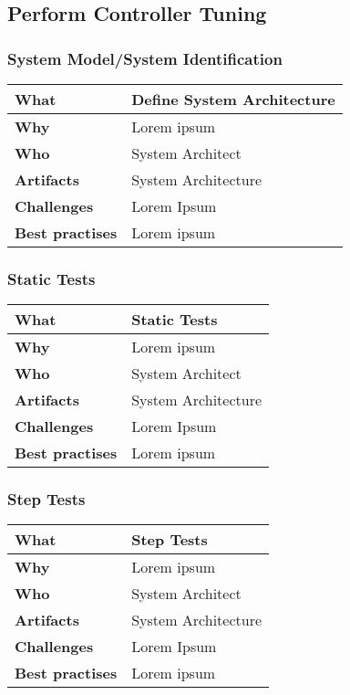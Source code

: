 \subsection{Perform Controller Tuning}
\subsubsection{System Model/System Identification}
 \label{table:ch6_Task_Controler_Tuning}
\begin{tabular}
	{|m{3cm}|m{10cm}|} \hline \bfseries What & Define System Architecture\\
	\hline \bfseries Why & Lorem ipsum\\
	\hline \bfseries Who & System Architect\\
	\hline \bfseries Artifacts & System Architecture\\
	\hline \bfseries Challenges & Lorem Ipsum\\
	\hline \bfseries Best practises & Lorem ipsum\\
	\hline 
\end{tabular}

\subsubsection{Static Tests}
 \label{table:ch6_Task_Static_Tests}
\begin{tabular}
	{|m{3cm}|m{10cm}|} \hline \bfseries What & Static Tests\\
	\hline \bfseries Why & Lorem ipsum\\
	\hline \bfseries Who & System Architect\\
	\hline \bfseries Artifacts & System Architecture\\
	\hline \bfseries Challenges & Lorem Ipsum\\
	\hline \bfseries Best practises & Lorem ipsum\\
	\hline 
\end{tabular}

\subsubsection{Step Tests}
 \label{table:ch6_Task_Step_Tests}
\begin{tabular}
	{|m{3cm}|m{10cm}|} \hline \bfseries What & Step Tests\\
	\hline \bfseries Why & Lorem ipsum\\
	\hline \bfseries Who & System Architect\\
	\hline \bfseries Artifacts & System Architecture\\
	\hline \bfseries Challenges & Lorem Ipsum\\
	\hline \bfseries Best practises & Lorem ipsum\\
	\hline 
\end{tabular}

